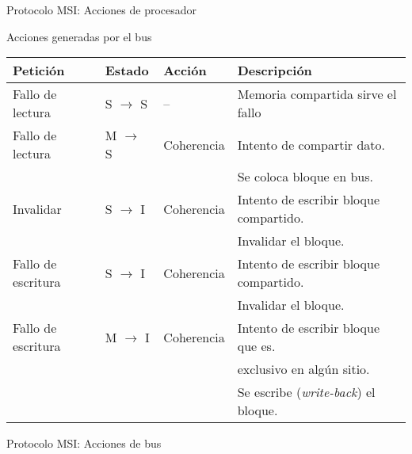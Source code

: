 \begin{frame}[t]{Protocolo MSI: Acciones de procesador}
\makebox[\textwidth][c]{

}
\end{frame}


\begin{frame}[t,shrink=5]{Acciones generadas por el bus}

{\scriptsize
\begin{tabular}{l|l|l|l}

Petición & Estado & Acción & Descripción\\
\hline
\hline

\pause Fallo de lectura &
S $\rightarrow$ S &
-- &
Memoria compartida sirve el fallo
\\
\hline

\pause Fallo de lectura &
M $\rightarrow$ S &
Coherencia &
Intento de compartir dato.
\\

& & &
Se coloca bloque en bus.
\\
\hline

\pause Invalidar &
S $\rightarrow$ I &
Coherencia &
Intento de escribir bloque compartido.
\\

& & & 
Invalidar el bloque.
\\
\hline

\pause Fallo de escritura &
S $\rightarrow$ I &
Coherencia &
Intento de escribir bloque compartido.
\\

& & &
Invalidar el bloque.
\\
\hline

\pause Fallo de escritura &
M $\rightarrow$ I &
Coherencia &
Intento de escribir bloque que es.
\\

& & &
exclusivo en algún sitio.
\\

& & &
Se escribe (\emph{write-back}) el bloque.
\\
\hline

\end{tabular}
}
\end{frame}

\begin{frame}[t]{Protocolo MSI: Acciones de bus}
\makebox[\textwidth][c]{

}
\end{frame}

